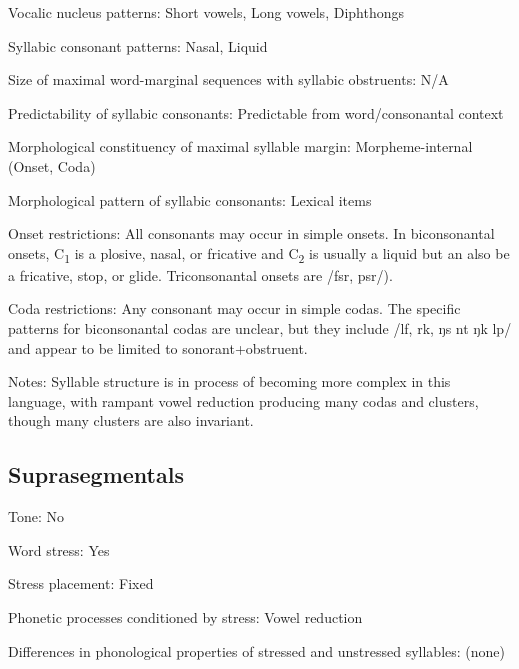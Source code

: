 {\begin{appendixdesc}
\item[Vocalic nucleus patterns:] Short vowels, Long vowels, Diphthongs

\item[Syllabic consonant patterns:] Nasal, Liquid

\item[Size of maximal word-marginal sequences with syllabic obstruents:] N/A

\item[Predictability of syllabic consonants:] Predictable from word/consonantal context

\item[Morphological constituency of maximal syllable margin:] Morpheme-internal (Onset, Coda)

\item[Morphological pattern of syllabic consonants:] Lexical items

\item[Onset restrictions:] All consonants may occur in simple onsets. In biconsonantal onsets, C\textsubscript{1} is a plosive, nasal, or fricative and C\textsubscript{2} is usually a liquid but an also be a fricative, stop, or glide. Triconsonantal onsets are /fsr, psr/).

\item[Coda restrictions:] Any consonant may occur in simple codas. The specific patterns for biconsonantal codas are unclear, but they include /lf, rk, ŋs nt ŋk lp/ and appear to be limited to sonorant+obstruent.

\item[Notes:] Syllable structure is in process of becoming more complex in this language, with rampant vowel reduction producing many codas and clusters, though many clusters are also invariant.
\end{appendixdesc}
\subsection*{Suprasegmentals}
\begin{appendixdesc}
\item[Tone:] No

\item[Word stress:] Yes

\item[Stress placement:] Fixed

\item[Phonetic processes conditioned by stress:] Vowel reduction

\item[Differences in phonological properties of stressed and unstressed syllables:] (none)


\end{appendixdesc}}

